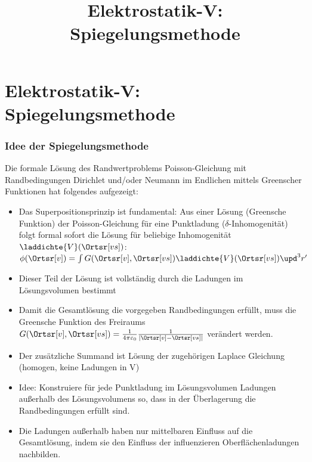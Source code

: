 

\title[TET: Elektrostatik-V: Spiegelungsmethode]{Elektrostatik-V: Spiegelungsmethode}


% 
% 

\maketitle

% 
% 
\section{Elektrostatik-V: Spiegelungsmethode}

\begin{frame}

  \frametitle{Idee der Spiegelungsmethode}
  Die \alert{formale Lösung} des Randwertproblems
  \alert{Poisson-Gleichung} mit Randbedingungen \alert{Dirichlet
    und/oder Neumann} im Endlichen mittels \alert{Greenscher Funktionen} hat folgendes aufgezeigt:
  \begin{itemize}[<+->]
    \item Das \alert{Superpositionsprinzip} ist fundamental: Aus einer
      Lösung (Greensche Funktion) der Poisson-Gleichung für eine \alert{Punktladung} ($\delta$-Inhomogenität) folgt formal sofort
      die Lösung für beliebige Inhomogenität $\laddichte{V}(\Ortsr[vs])$: $\phi (\Ortsr[v]) = \int
      G (\Ortsr[v],\Ortsr[vs]) \laddichte{V}(\Ortsr[vs]) \upd^3r'$
      \item Dieser Teil der Lösung ist vollständig durch \alert{die Ladungen
        im Lösungsvolumen} bestimmt
        \item Damit die Gesamtlösung die vorgegeben Randbedingungen
          erfüllt, muss die \alert{Greensche Funktion des Freiraums} $G (\Ortsr[v],\Ortsr[vs]) = \frac{1}{4\pi\varepsilon_0} \frac{1}{|\Ortsr[v]-\Ortsr[vs]|}$ verändert
          werden.
          \item Der zusätzliche Summand ist Lösung der zugehörigen
            \alert{Laplace Gleichung} (homogen, \alert{keine Ladungen
              in V})
              \item \alert{Idee:} Konstruiere für jede Punktladung im
                Lösungsvolumen Ladungen \alert{außerhalb} des
                Lösungsvolumens so, dass in der Überlagerung die
                Randbedingungen erfüllt sind.
                \item Die Ladungen außerhalb haben nur mittelbaren
                  Einfluss auf die Gesamtlösung, indem sie
                  den Einfluss der \alert{influenzieren Oberflächenladungen} nachbilden.
    \end{itemize}

  
  \end{frame}

